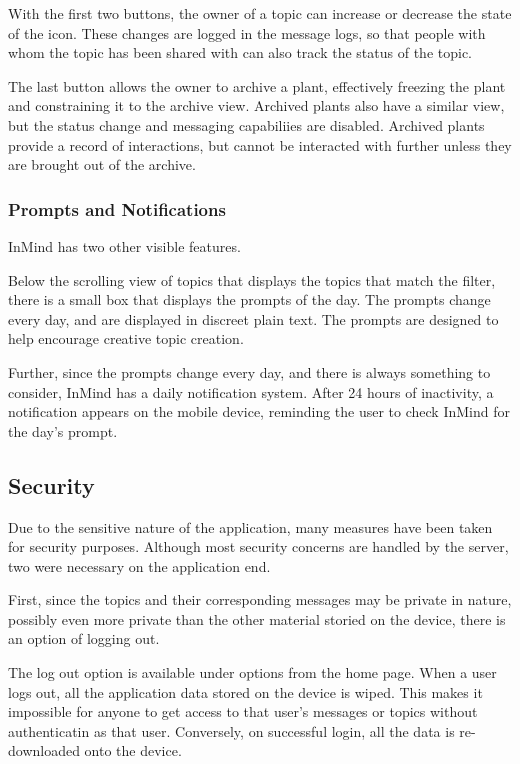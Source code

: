       With the first two buttons,
      the owner of a topic can increase or decrease the state of the icon.
      These changes are logged in the message logs,
      so that people with whom the topic has been shared with
      can also track the status of the topic.

      The last button allows the owner to archive a plant,
      effectively freezing the plant and constraining it to the archive view.
      Archived plants also have a similar view,
      but the status change and messaging capabiliies are disabled.
      Archived plants provide a record of interactions,
      but cannot be interacted with further unless they are brought out of the archive.

      \subsubsection{Prompts and Notifications}
      InMind has two other visible features.

      Below the scrolling view of topics that displays the topics
      that match the filter, there is a small box that displays the prompts of the day.
      The prompts change every day, and are displayed in discreet plain text.
      The prompts are designed to help encourage creative topic creation.

      Further, since the prompts change every day,
      and there is always something to consider, InMind has a daily notification system.
      After 24 hours of inactivity, a notification appears on the mobile device,
      reminding the user to check InMind for the day's prompt.

    \subsection{Security}
      Due to the sensitive nature of the application,
      many measures have been taken for security purposes.
      Although most security concerns are handled by the server,
      two were necessary on the application end.

      First, since the topics and their corresponding messages may be private in nature,
      possibly even more private than the other material storied on the device,
      there is an option of logging out.

      The log out option is available under options from the home page.
      When a user logs out, all the application data stored on the device is wiped.
      This makes it impossible for anyone to get access to that user's
      messages or topics without authenticatin as that user.
      Conversely, on successful login, all the data is re-downloaded onto the device.

